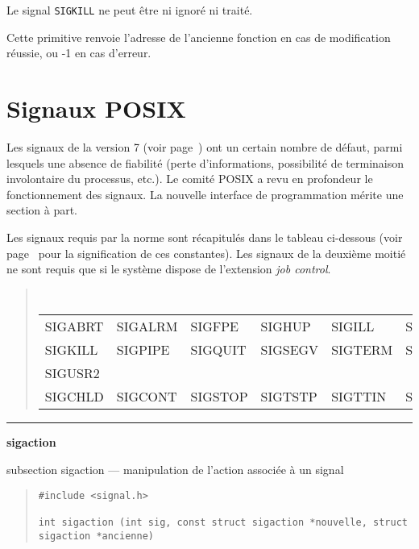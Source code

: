 \documentclass [twoside] {report}
\newcommand {\primitive} [1]
    {
	\phantomsection
	{\large \bf #1}
	\addcontentsline {toc} {subsection} {#1}
    }
\newcommand {\separation}
    {
	\vspace {5mm}
	\nopagebreak
	\hrule
    }
\begin{document}
Le signal {\tt SIGKILL} ne peut être ni ignoré ni
traité.

Cette primitive renvoie l'adresse de l'ancienne
fonction en cas de modification réussie, ou -1 en
cas d'erreur.



\section {Signaux POSIX}

Les signaux de la version 7 (voir page~\pageref {ps:sigv7}) ont un
certain nombre de défaut, parmi lesquels une absence de fiabilité (perte
d'informations, possibilité de terminaison involontaire du processus,
etc.).  Le comité POSIX a revu en profondeur le fonctionnement des
signaux.  La nouvelle interface de programmation mérite une section à
part.

Les signaux requis par la norme sont récapitulés dans le tableau
ci-dessous (voir page~\pageref {ps:sigv7} pour la signification de ces
constantes).  Les signaux de la deuxième moitié ne sont requis que si le
système dispose de l'extension {\em job control}.

\begin {quote}
    \small\tt
    \begin {tabular} {|llllll|} \hline
	SIGABRT & SIGALRM & SIGFPE  & SIGHUP  & SIGILL  & SIGINT  \\
	SIGKILL & SIGPIPE & SIGQUIT & SIGSEGV & SIGTERM & SIGUSR1 \\
	SIGUSR2 &         &         &         &         &         \\ \hline
	SIGCHLD & SIGCONT & SIGSTOP & SIGTSTP & SIGTTIN & SIGTTOU \\ \hline
    \end {tabular}
\end {quote}



\separation
\primitive {sigaction} --- manipulation de l'action associée à un signal

\begin {quote}
\begin {verbatim}
#include <signal.h>

int sigaction (int sig, const struct sigaction *nouvelle, struct sigaction *ancienne)
\end{verbatim}
\end {quote}
\end{document}
